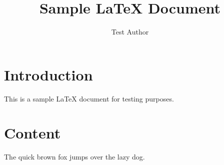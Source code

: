 \documentclass{article}
\title{Sample LaTeX Document}
\author{Test Author}
\begin{document}
\maketitle

\section{Introduction}
This is a sample LaTeX document for testing purposes.

\section{Content}
The quick brown fox jumps over the lazy dog.
\end{document}
